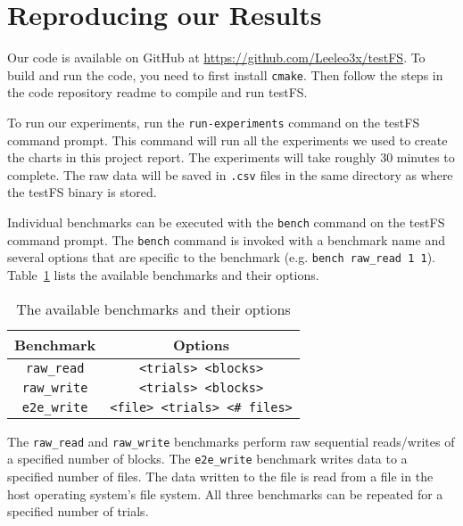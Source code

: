 \section{Reproducing our Results}
Our code is available on GitHub at \url{https://github.com/Leeleo3x/testFS}.
To build and run the code, you need to first install {\tt cmake}. Then
follow the steps in the code repository readme to compile and run testFS.

To run our experiments, run the {\tt run-experiments} command on the testFS
command prompt. This command will run all the experiments we used to create the
charts in this project report. The experiments will take roughly 30 minutes to
complete. The raw data will be saved in {\tt .csv} files in the same directory
as where the testFS binary is stored.

Individual benchmarks can be executed with the {\tt bench} command on the
testFS command prompt. The {\tt bench} command is invoked with a benchmark name
and several options that are specific to the benchmark (e.g. {\tt bench
  raw\_read 1 1}). Table~\ref{tbl:bench-commands} lists the available
benchmarks and their options.

\begin{table}[h!]
  \centering
  \caption{The available benchmarks and their options}
  \label{tbl:bench-commands}
  \begin{tabular}{c|c}
    {\bf Benchmark} & {\bf Options} \\ \hline
    {\tt raw\_read} & {\tt <trials> <blocks>} \\ \hline
    {\tt raw\_write} & {\tt <trials> <blocks>} \\ \hline
    {\tt e2e\_write} & {\tt <file> <trials> <\# files>}
  \end{tabular}
\end{table}

The {\tt raw\_read} and {\tt raw\_write} benchmarks perform raw sequential
reads/writes of a specified number of blocks. The {\tt e2e\_write} benchmark
writes data to a specified number of files. The data written to the file is
read from a file in the host operating system's file system. All three
benchmarks can be repeated for a specified number of trials.

